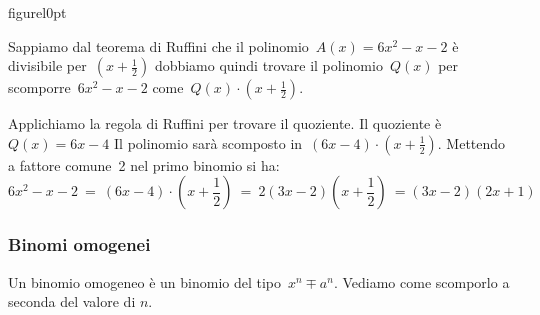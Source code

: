 \begin{wrapfloat}{figure}{l}{0pt}
% 
\scompruffinid
\end{wrapfloat}
Sappiamo dal teorema di Ruffini che il polinomio~\(A(x)=6x^{2}-x-2\) è
divisibile per~\(\left(x+\frac{1}{2}\right)\) dobbiamo quindi trovare il
polinomio~\(Q(x)\) per scomporre~\(6x^{2}-x-2\) 
come~\(Q(x)\cdot \left(x+\frac{1}{2}\right)\).

Applichiamo la regola di Ruffini per trovare il quoziente. 
Il quoziente è~\(Q(x)=6x-4\)
Il polinomio sarà scomposto in~\((6x-4)\cdot\left(x+\frac{1}{2}\right)\).
Mettendo a fattore comune~2 nel primo binomio si ha:
\[6x^{2}-x-2\ =
\ (6x-4)\cdot \left(x+\frac{1}{2}\right)\ =
\ 2(3x-2)\left(x+\frac{1}{2}\right)\ =(3x-2)(2x+1)\]





\subsubsection{Binomi omogenei}
\label{subsubsec:divpol_binomo}

Un binomio omogeneo è un binomio del tipo~\(x^{n} \mp a^{n}\).
Vediamo come scomporlo a seconda del valore di \(n\).

